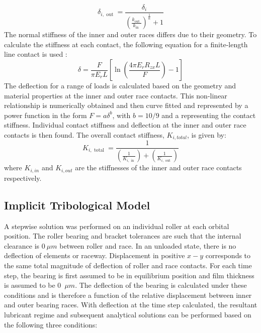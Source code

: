 \begin{equation}\label{Deflection at each contact}
	\delta_{i, \text { out }}=\frac{\delta_i}{\left(\frac{k_{\text {out }}}{k_{\text {in }}}\right)^{\frac{1}{n}}+1}
\end{equation}
The normal stiffness of the inner and outer races differs due to their geometry. To calculate the stiffness at each contact, the following equation for a finite-length line contact is used \cite{Hertz1881} \cite{Johnson1985}:
\begin{equation}\label{Contact stiffness experimental}
	\delta=\frac{F}{\pi E_r L}\left[\ln \left(\frac{4 \pi E_r R_{z x} L}{F}\right)-1\right]
\end{equation}
The deflection for a range of loads is calculated based on the geometry and material properties at the inner and outer race contacts. This non-linear relationship is numerically obtained and then curve fitted and represented by a power function in the form $F=a\delta^b$, with $b=10/9$ and a representing the contact stiffness. Individual contact stiffness and deflection at the inner and outer race contacts is then found. The overall contact stiffness, $K_{i,total}$, is given by:
\begin{equation}\label{Overall contact stiffness}
	K_{i, \text { total }}=\frac{1}{\left(\frac{1}{K_{i, \text { in }}}\right)+\left(\frac{1}{K_{i, \text { out }}}\right)}
\end{equation}
where $K_{i,in}$ and $K_{i,out}$ are the stiffnesses of the inner and outer race contacts respectively.

\subsection{Implicit Tribological Model}

A stepwise solution was performed on an individual roller at each orbital position. The roller bearing and bracket tolerances are such that the internal clearance is $0~\mu m$ between roller and race. In an unloaded state, there is no deflection of elements or raceway. Displacement in positive $x-y$ corresponds to the same total magnitude of deflection of roller and race contacts. For each time step, the bearing is first assumed to be in equilibrium position and film thickness is assumed to be 0~$\mu m$. The deflection of the bearing is calculated under these conditions and is therefore a function of the relative displacement between inner and outer bearing races. With deflection at the time step calculated, the resultant lubricant regime and subsequent analytical solutions can be performed based on the following three conditions:

